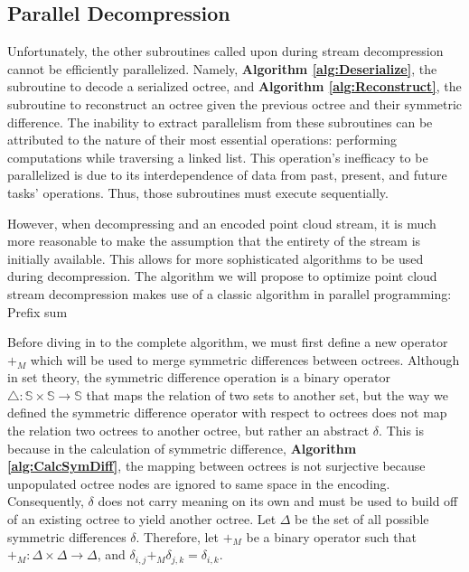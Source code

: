 \documentclass[twoside,twocolumn]{article}
\newcommand{\symdiff}{\ensuremath{\bigtriangleup}}
\begin{document}

\subsection{Parallel Decompression} \label{sec:Parallel Decompression}

Unfortunately, the other subroutines called upon during stream decompression cannot be efficiently
parallelized. Namely, \textbf{Algorithm \ref{alg:Deserialize}}, the subroutine to decode a serialized
octree, and \textbf{Algorithm \ref{alg:Reconstruct}}, the subroutine to reconstruct an octree given the
previous octree and their symmetric difference. The inability to extract parallelism from these subroutines
can be attributed to the nature of their most essential operations: performing computations while
traversing a linked list. This operation's inefficacy to be parallelized is due to its interdependence
of data from past, present, and future tasks' operations. Thus, those subroutines must execute sequentially.

However, when decompressing and an encoded point cloud stream, it is much more reasonable to make the
assumption that the entirety of the stream is initially available. This allows for more sophisticated
algorithms to be used during decompression. The algorithm we will propose to optimize point cloud
stream decompression makes use of a classic algorithm in parallel programming: Prefix sum \cite{prefix}

Before diving in to the complete algorithm, we must first define a new operator $+_M$ which will be used
to merge symmetric differences between octrees. Although in set theory, the symmetric difference operation
is a binary operator $\symdiff: \mathbb{S} \times \mathbb{S} \rightarrow \mathbb{S}$ that maps the relation
of two sets to another set, but the way we defined the symmetric difference operator with respect to octrees
does not map the relation two octrees to another octree, but rather an abstract $\delta$. This is because
in the calculation of symmetric difference, \textbf{Algorithm \ref{alg:CalcSymDiff}}, the mapping between
octrees is not surjective because unpopulated octree nodes are ignored to same space in the encoding.
Consequently, $\delta$ does not carry meaning on its own and must be used to build off of an existing
octree to yield another octree. Let $\Delta$ be the set of all possible symmetric differences $\delta$.
Therefore, let $+_M$ be a binary operator such that $+_M: \Delta \times \Delta \rightarrow \Delta$, and
$\delta_{i,j} +_M \delta_{j,k} = \delta_{i,k}$.
\end{document}
